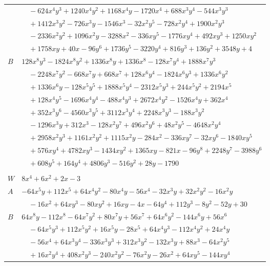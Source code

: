 \documentclass[11pt]{article}
\begin{document}
\begin{longtable}{@{}ll@{}}
 & $\quad -624x^{4}y^{3}+1240x^{4}y^{2}+1168x^{4}y-1720x^{4}+688x^{3}y^{4}-544x^{3}y^{3}$\\
 & $\quad +1412x^{3}y^{2}-726x^{3}y-1546x^{3}-32x^{2}y^{5}-728x^{2}y^{4}+1900x^{2}y^{3}$\\
 & $\quad -2336x^{2}y^{2}+1096x^{2}y-3288x^{2}-336xy^{5}-1776xy^{4}+492xy^{3}+1250xy^{2}$\\
 & $\quad +1758xy+40x-96y^{6}+1736y^{5}-3220y^{4}+816y^{3}+136y^{2}+3548y+4$\\
$B$ & $128x^{8}y^{3}-1824x^{8}y^{2}+1336x^{8}y+1336x^{8}-128x^{7}y^{4}+1888x^{7}y^{3}$\\
 & $\quad -2248x^{7}y^{2}-668x^{7}y+668x^{7}+128x^{6}y^{4}-1824x^{6}y^{3}+1336x^{6}y^{2}$\\
 & $\quad +1336x^{6}y-128x^{5}y^{5}+1888x^{5}y^{4}-2312x^{5}y^{3}+244x^{5}y^{2}+2194x^{5}$\\
 & $\quad +128x^{4}y^{5}-1696x^{4}y^{4}-488x^{4}y^{3}+2672x^{4}y^{2}-1526x^{4}y+362x^{4}$\\
 & $\quad +352x^{3}y^{6}-4560x^{3}y^{5}+3112x^{3}y^{4}+2248x^{3}y^{3}-188x^{3}y^{2}$\\
 & $\quad -1296x^{3}y+312x^{3}-128x^{2}y^{7}+496x^{2}y^{6}+48x^{2}y^{5}-4648x^{2}y^{4}$\\
 & $\quad +2958x^{2}y^{3}+1161x^{2}y^{2}+1115x^{2}y-284x^{2}-336xy^{7}-32xy^{6}-1840xy^{5}$\\
 & $\quad +576xy^{4}+4782xy^{3}-1434xy^{2}+1365xy-821x-96y^{8}+2248y^{7}-3988y^{6}$\\
 & $\quad +608y^{5}+164y^{4}+4806y^{3}-516y^{2}+28y-1790$\\
\addlinespace[3pt]
\multicolumn{2}{@{}l}{$i=38$, $m=2$, neighbours $4,6,13,19,36,40$}\\
$W$ & $8x^{4}+6x^{2}+2x-3$\\
$A$ & $-64x^{5}y+112x^{5}+64x^{4}y^{2}-80x^{4}y-56x^{4}-32x^{3}y+32x^{2}y^{2}-16x^{2}y$\\
 & $\quad -16x^{2}+64xy^{3}-80xy^{2}+16xy-4x-64y^{4}+112y^{3}-8y^{2}-52y+30$\\
$B$ & $64x^{8}y-112x^{8}-64x^{7}y^{2}+80x^{7}y+56x^{7}+64x^{6}y^{2}-144x^{6}y+56x^{6}$\\
 & $\quad -64x^{5}y^{3}+112x^{5}y^{2}+16x^{5}y-28x^{5}+64x^{4}y^{3}-112x^{4}y^{2}+24x^{4}y$\\
 & $\quad -56x^{4}+64x^{3}y^{4}-336x^{3}y^{3}+312x^{3}y^{2}-132x^{3}y+88x^{3}-64x^{2}y^{5}$\\
 & $\quad +16x^{2}y^{4}+408x^{2}y^{3}-240x^{2}y^{2}-76x^{2}y-26x^{2}+64xy^{5}-144xy^{4}$\\

\end{longtable}
\end{document}
